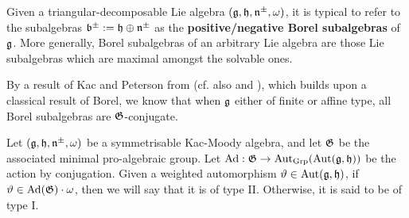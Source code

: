         Given a triangular-decomposable Lie algebra $(\mathfrak{g}, \mathfrak{h}, \mathfrak{n}^{\pm}, \omega)$, it is typical to refer to the subalgebras $\mathfrak{b}^{\pm} := \mathfrak{h} \oplus \mathfrak{n}^{\pm}$ as the \textbf{positive/negative Borel subalgebras} of $\mathfrak{g}$. More generally, Borel subalgebras of an arbitrary Lie algebra are those Lie subalgebras which are maximal amongst the solvable ones.

        \begin{proposition} \label{prop: minimal_kac_moody_groups}
        \end{proposition}
        \begin{remark} \label{remark: conjugacy_of_borel_subalgebras_of_kac_moody_algebras}
            By a result of Kac and Peterson from \cite{kac_peterson_infinite_flag_varieties_and_conjugacy_of_cartan_subalgebras} (cf. also \cite{chernousov_egorov_gille_pianzola_cohomological_proof_of_peterson_kac_theorem} and \cite{chernousov_neher_pianzola_conjugacy_of_cartan_subalgebras_in_EALAs_with_non_fgc_centreless_cores}), which builds upon a classical result of Borel, we know that when $\mathfrak{g}$ either of finite or affine type, all Borel subalgebras are $\mathfrak{G}$-conjugate.
        \end{remark}

        \begin{definition} \label{def: weighted_automorphisms_of_types_I_and_II}
            Let $(\mathfrak{g}, \mathfrak{h}, \mathfrak{n}^{\pm}, \omega)$ be a symmetrisable Kac-Moody algebra, and let $\mathfrak{G}$ be the associated minimal pro-algebraic group. Let $\mathrm{Ad}: \mathfrak{G} \to \operatorname{Aut}_{\mathrm{Grp}}( \operatorname{Aut}(\mathfrak{g}, \mathfrak{h}) )$ be the action by conjugation. Given a weighted automorphism $\vartheta \in \operatorname{Aut}(\mathfrak{g}, \mathfrak{h})$, if $\vartheta \in \mathrm{Ad}(\mathfrak{G}) \cdot \omega$, then we will say that it is of type II. Otherwise, it is said to be of type I.
        \end{definition}